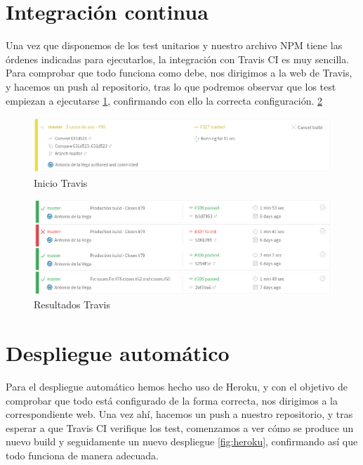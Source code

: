 \section {Integración continua}
Una vez que disponemos de los test unitarios y nuestro archivo NPM tiene las órdenes indicadas para ejecutarlos, la integración con Travis CI es muy sencilla. Para comprobar que todo funciona como debe, nos dirigimos a la web de Travis, y hacemos un push al repositorio, tras lo que podremos observar que los test empiezan a ejecutarse \ref{fig:travis}, confirmando con ello la correcta configuración. \ref{fig:travis2}

\begin{figure}
  \begin{center}
    \includegraphics[width=\textwidth]{imagenes/init_travis.png}
    \caption{Inicio Travis}
    \label{fig:travis}
  \end{center}
\end{figure}
\begin{figure}
  \begin{center}
    \includegraphics[width=\textwidth]{imagenes/travis.png}
    \caption{Resultados Travis}
    \label{fig:travis2}
  \end{center}
\end{figure}


\section {Despliegue automático}
Para el despliegue automático hemos hecho uso de Heroku, y con el objetivo de comprobar que todo está configurado de la forma correcta, nos dirigimos a la correspondiente web. Una vez ahí, hacemos un push a nuestro repositorio, y tras esperar a que Travis CI verifique los test, comenzamos a ver cómo se produce un nuevo build y seguidamente un nuevo despliegue \ref{fig:heroku}, confirmando así que todo funciona de manera adecuada.


